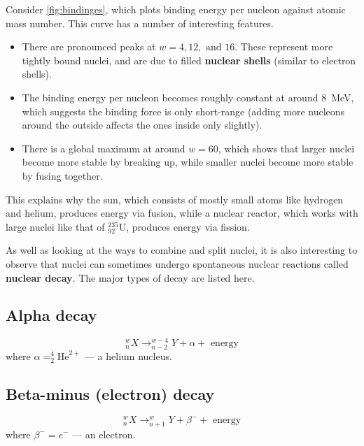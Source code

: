 \documentclass[a4paper]{amsbook}
\newcommand{\marginsymbol}{}
\theoremstyle{definition}
\numberwithin{exercise}{chapter}
\numberwithin{exercise}{chapter}
\begin{document}
\marginsymbol Consider \cref{fig:bindinges}, which plots binding energy per nucleon against atomic mass number. This curve has a number of interesting features.

\begin{itemize}
  \item There are pronounced peaks at $ w = 4, 12, \text{ and } 16 $. These represent more tightly bound
        nuclei, and are due to filled \textbf{nuclear shells} (similar to electron shells).
  \item The binding energy per nucleon becomes roughly constant at around \SI{8}{\mega\electronvolt}, which
        suggests the binding force is only short-range (adding more nucleons around the outside affects the ones
        inside only slightly).
  \item There is a global maximum at around $ w = 60 $, which shows that larger nuclei become more stable by
        breaking up, while smaller nuclei become more stable by fusing together.
\end{itemize}

This explains why the sun, which consists of mostly small atoms like hydrogen and helium, produces energy via
fusion, while a nuclear reactor, which works with large nuclei like that of $ ^{235}_{92} \mathrm{U} $, produces
energy via fission.

As well as looking at the ways to combine and split nuclei, it is also interesting to observe that nuclei can sometimes
undergo spontaneous nuclear reactions called \textbf{nuclear decay}. The major types of decay are listed here.

\subsection*{Alpha decay}
\begin{displaymath}
  ^w_n X \rightarrow ^{w - 4}_{n - 2} Y + \alpha + \text{ energy}
\end{displaymath}
where $ \alpha = ^4_2\mathrm{He}^{2+} $ --- a helium nucleus.

\subsection*{Beta-minus (electron) decay}
\begin{displaymath}
  ^w_n X \rightarrow ^{w}_{n + 1} Y + \beta^- + \text{ energy}
\end{displaymath}
where $ \beta^- = e^- $ --- an electron.
\end{document}
